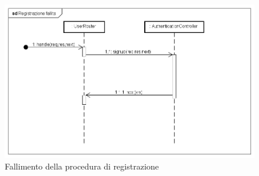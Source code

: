 \begin{itemize}
\label{Fallimento della procedura di registrazione}
\begin{figure}[ht]
	\centering
	\includegraphics[scale=0.40]{UML/DiagrammiDiSequenza/Back-end/POST__lang_signup_failure.png}
	\caption{Fallimento della procedura di registrazione}
\end{figure}
\FloatBarrier

\end{itemize}

